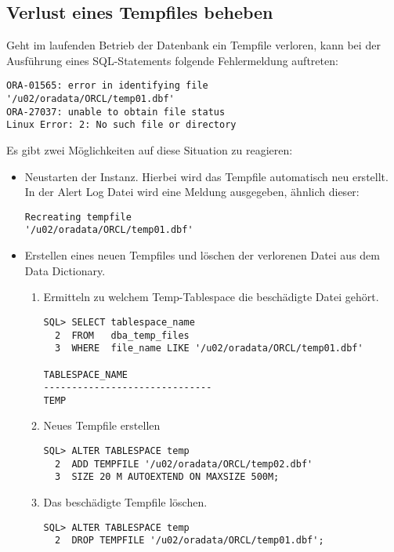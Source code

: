       \subsection{Verlust eines Tempfiles beheben}
        Geht im laufenden Betrieb der Datenbank ein Tempfile verloren, kann bei der Ausf\"uhrung eines SQL-Statements folgende Fehlermeldung auftreten:
        \begin{lstlisting}[caption={Verlust eines Tempfiles},label=admin1429,language=oracle_sql]
ORA-01565: error in identifying file
'/u02/oradata/ORCL/temp01.dbf'
ORA-27037: unable to obtain file status
Linux Error: 2: No such file or directory
        \end{lstlisting}
        Es gibt zwei M\"oglichkeiten auf diese Situation zu reagieren:
        \begin{itemize}
          \item Neustarten der Instanz. Hierbei wird das Tempfile automatisch neu erstellt. In der Alert Log Datei wird eine Meldung ausgegeben, \"ahnlich dieser:
          \begin{lstlisting}[caption={Automatisches Neuerstellen eines Tempfiles},label=admin1430,language=oracle_sql]
Recreating tempfile
'/u02/oradata/ORCL/temp01.dbf'
          \end{lstlisting}
          \item Erstellen eines neuen Tempfiles und l\"oschen der verlorenen Datei aus dem Data Dictionary.
            \begin{enumerate}
              \item Ermitteln zu welchem Temp-Tablespace die besch\"adigte Datei geh\"ort.
                \begin{lstlisting}[caption={Ermitteln des richtigen Temp-Tablespace},label=admin1431,language=oracle_sql]
SQL> SELECT tablespace_name
  2  FROM   dba_temp_files
  3  WHERE  file_name LIKE '/u02/oradata/ORCL/temp01.dbf'

TABLESPACE_NAME
------------------------------
TEMP
                \end{lstlisting}
              \item Neues Tempfile erstellen
              \begin{lstlisting}[caption={Neues Tempfile erstellen},label=admin1432,language=oracle_sql]
SQL> ALTER TABLESPACE temp
  2  ADD TEMPFILE '/u02/oradata/ORCL/temp02.dbf'
  3  SIZE 20 M AUTOEXTEND ON MAXSIZE 500M;
              \end{lstlisting}
              \item Das besch\"adigte Tempfile l\"oschen.
              \begin{lstlisting}[caption={Besch\"adigtes Tempfile l\"oschen},label=admin1433,language=oracle_sql]
SQL> ALTER TABLESPACE temp
  2  DROP TEMPFILE '/u02/oradata/ORCL/temp01.dbf';
              \end{lstlisting}
            \end{enumerate}
        \end{itemize}
